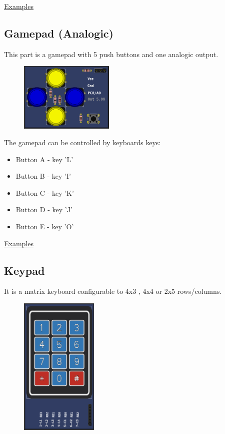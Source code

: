 \href{https://lcgamboa.github.io/picsimlab_examples/parts_Gamepad.html}{Examples}

\subsection{Gamepad (Analogic)}

This part is a gamepad with 5 push buttons and one analogic output.

\begin{figure}[H]
\center
\includegraphics[width=0.4\textwidth]{img/part_gamepad_an.png} 
\end{figure} 


The gamepad can be controlled by keyboards keys:
\begin{itemize}
 \item Button A - key 'L'
 \item Button B - key 'I'
 \item Button C - key 'K'
 \item Button D - key 'J'
 \item Button E - key 'O'
 \end{itemize}


\href{https://lcgamboa.github.io/picsimlab_examples/parts_Gamepad_(Analogic).html}{Examples}

\subsection{Keypad}

It is a matrix keyboard configurable to 4x3 , 4x4 or 2x5 rows/columns.

\begin{figure}[H]
\center
\includegraphics[width=0.33\textwidth]{img/part_keyb_4x3.png} 
\end{figure} 

